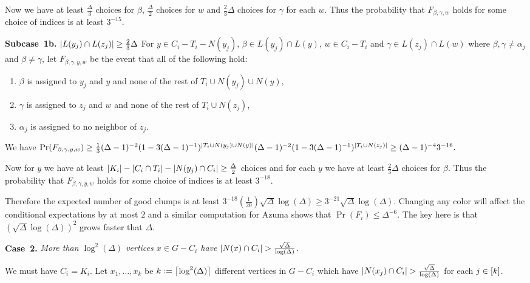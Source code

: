 Now we have at least $\frac{\Delta}{3}$ choices for $\beta$, $\frac{\Delta}{2}$
choices for $w$ and $\frac 23 \Delta$ choices for $\gamma$ for each $w$.  Thus
the probability that $F_{\beta, \gamma, w}$ holds for some choice of indices is
at least $3^{-15}$.

\textbf{Subcase~1b.} \textit{$\left|L(y_j) \cap L(z_j)\right| \geq \frac23 \Delta$}
For $y \in C_i - T_i - N(y_j)$, $\beta \in L(y_j) \cap L(y)$, $w \in C_i - T_i$
and $\gamma \in L(z_j) \cap L(w)$ where $\beta, \gamma \neq \alpha_j$ and $\beta \neq \gamma$, let
$F_{\beta, \gamma, y, w}$ be the event that all of the following hold:

\begin{enumerate}
  \item $\beta$ is assigned to $y_j$ and $y$ and none of the rest of $T_i \cup
  N(y_j) \cup N(y)$,
  \item $\gamma$ is assigned to $z_j$ and $w$ and none of the rest of $T_i \cup N(z_j)$,
  \item $\alpha_j$ is assigned to no neighbor of $z_j$.
\end{enumerate}

We have $\Pr(F_{\beta, \gamma, y, w}) \geq
\frac13 (\Delta-1)^{-2}(1-3(\Delta-1)^{-1})^{\left|T_i \cup
N(y_j) \cup N(y)\right|}(\Delta-1)^{-2}(1 - 3(\Delta-1)^{-1})^{\left|T_i \cup N(z_j)\right|} \geq
(\Delta-1)^{-4}3^{-16}.$

Now for $y$ we have at least $\left|K_i\right| - \left|C_i \cap T_i\right| - \left|N(y_j)
\cap C_i\right| \geq \frac{\Delta}{2}$ choices and for each $y$ we have at least
$\frac23 \Delta$ choices for $\beta$. Thus the probability that $F_{\beta,
\gamma, y, w}$ holds for some choice of indices is at least $3^{-18}$.

\bigskip

Therefore the expected number of good clumps is at least $3^{-18}
(\frac{1}{20})\sqrt{\Delta}\log(\Delta) \geq 3^{-21} \sqrt{\Delta}\log(\Delta)$.   
Changing any color will affect the conditional expectations by at most $2$ and a
similar computation for Azuma shows that $\Pr(F_i) \leq \Delta^{-6}$.  The key
here is that $(\sqrt{\Delta}\log(\Delta))^2$ grows faster that $\Delta$.

\textbf{Case~2.} \textit{More than $\log^2(\Delta)$ vertices $x \in G  - C_i$ have
$\left|N(x) \cap C_i\right| > \frac{\sqrt{\Delta}}{\log(\Delta)}$.}

We must have $C_i = K_i$.  Let $x_1, \ldots, x_k$ be $k \mathrel{\mathop:}=
\left\lceil\log^2(\Delta)\right\rceil$ different vertices in $G - C_i$ which have $\left|N(x_j)
\cap C_i\right| > \frac{\sqrt{\Delta}}{\log(\Delta)}$ for each $j \in \left[k\right]$.  

